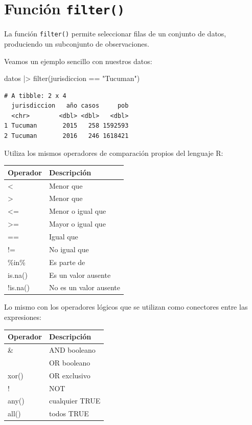 \documentclass[
  spanish,
  a4paper,
]{scrbook}
\newenvironment{Shaded}{\begin{snugshade}}{\end{snugshade}}
\newcommand{\FunctionTok}[1]{\textcolor[rgb]{0.28,0.35,0.67}{#1}}
\newcommand{\NormalTok}[1]{\textcolor[rgb]{0.00,0.23,0.31}{#1}}
\newcommand{\SpecialCharTok}[1]{\textcolor[rgb]{0.37,0.37,0.37}{#1}}
\newcommand{\StringTok}[1]{\textcolor[rgb]{0.13,0.47,0.30}{#1}}
\newcounter{none} %
\begin{document}
\section{\texorpdfstring{Función
\texttt{filter()}}{Función filter()}}\label{funciuxf3n-filter}

La función \texttt{filter()} permite seleccionar filas de un conjunto de
datos, produciendo un subconjunto de observaciones.

Veamos un ejemplo sencillo con nuestros datos:

\begin{Shaded}
\begin{Highlighting}[]
\NormalTok{datos }\SpecialCharTok{|\textgreater{}}
  \FunctionTok{filter}\NormalTok{(jurisdiccion }\SpecialCharTok{==} \StringTok{"Tucuman"}\NormalTok{)}
\end{Highlighting}
\end{Shaded}

\begin{verbatim}
# A tibble: 2 x 4
  jurisdiccion   año casos     pob
  <chr>        <dbl> <dbl>   <dbl>
1 Tucuman       2015   258 1592593
2 Tucuman       2016   246 1618421
\end{verbatim}

Utiliza los mismos operadores de comparación propios del lenguaje R:

{\def\LTcaptype{none} %
\begin{longtable}[]{@{}ll@{}}
\toprule\noalign{}
Operador & Descripción \\
\midrule\noalign{}
\endhead
\bottomrule\noalign{}
\endlastfoot
\textless{} & Menor que \\
\textgreater{} & Menor que \\
\textless= & Menor o igual que \\
\textgreater= & Mayor o igual que \\
== & Igual que \\
!= & No igual que \\
\%in\% & Es parte de \\
is.na() & Es un valor ausente \\
!is.na() & No es un valor ausente \\
\end{longtable}
}

Lo mismo con los operadores lógicos que se utilizan como conectores
entre las expresiones:

{\def\LTcaptype{none} %
\begin{longtable}[]{@{}ll@{}}
\toprule\noalign{}
Operador & Descripción \\
\midrule\noalign{}
\endhead
\bottomrule\noalign{}
\endlastfoot
\& & AND booleano \\
\textbar{} & OR booleano \\
xor() & OR exclusivo \\
! & NOT \\
any() & cualquier TRUE \\
all() & todos TRUE \\
\end{longtable}
}
\end{document}
